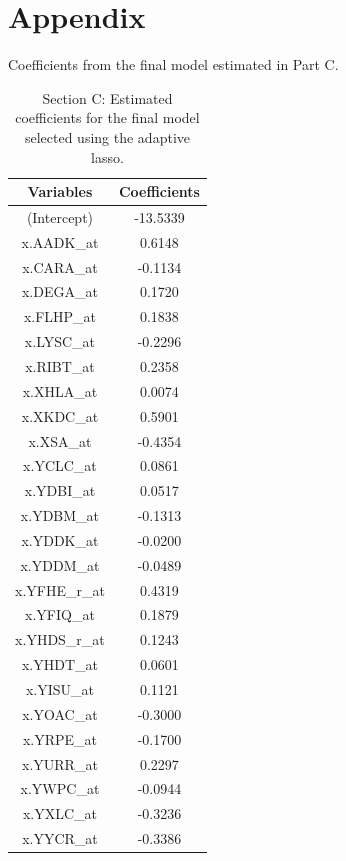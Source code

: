 \documentclass[paper=a4, fontsize=11pt]{scrartcl} %
\numberwithin{equation}{section} %
\begin{document}
\section{Appendix} \label{coeff}

Coefficients from the final model estimated in Part C.

\begin{table}[ht]
\centering
\begin{tabular}{|c|c|}
\hline
Variables &  Coefficients \\
\hline
(Intercept) & -13.5339     \\
x.AADK\_at  &   0.6148    \\
x.CARA\_at  &  -0.1134    \\
x.DEGA\_at  &  0.1720    \\
x.FLHP\_at  & 0.1838    \\
x.LYSC\_at  &  -0.2296    \\
x.RIBT\_at  &   0.2358    \\
x.XHLA\_at  &   0.0074    \\
x.XKDC\_at  &   0.5901    \\
x.XSA\_at   &  -0.4354    \\
x.YCLC\_at  &   0.0861    \\
x.YDBI\_at  &   0.0517    \\
x.YDBM\_at  &  -0.1313    \\
x.YDDK\_at  &  -0.0200    \\
x.YDDM\_at  &  -0.0489    \\
x.YFHE\_r\_at &  0.4319   \\
x.YFIQ\_at  &   0.1879    \\
x.YHDS\_r\_at &  0.1243   \\
x.YHDT\_at  &   0.0601    \\
x.YISU\_at  &   0.1121    \\
x.YOAC\_at  &  -0.3000    \\
x.YRPE\_at  &  -0.1700    \\
x.YURR\_at  &   0.2297    \\
x.YWPC\_at  &  -0.0944    \\
x.YXLC\_at  &  -0.3236    \\
x.YYCR\_at  &  -0.3386   \\
\hline
\end{tabular}
\caption{Section C: Estimated coefficients for the final model selected using the adaptive lasso.}
\label{final_model}
\end{table}
\end{document}
